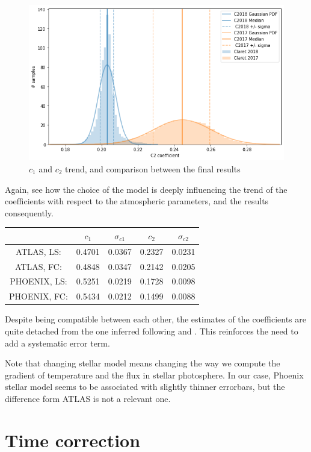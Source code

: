 \documentclass{aa}
\begin{document}
\begin{figure}[H]
    \includegraphics[scale=0.35, angle=0]{pictures/c2_comp.png}
    \caption{$c_1$ and $c_2$ trend, and comparison between the final results}
\end{figure}
Again, see how the choice of the model is deeply influencing the trend of 
the coefficients with respect to the atmospheric parameters, and the results 
consequently. 
\begin{table}[h!]
	\centering
	\begin{tabular}{ccccc}
		\hline
		& $c_1$ & $\sigma_{c1}$ & $c_2$ & $\sigma_{c2}$\\
		\hline
		ATLAS, LS:      & 0.4701 & 0.0367 &0.2327 &0.0231 \\
		ATLAS, FC:      & 0.4848 & 0.0347 & 0.2142 &  0.0205 \\
		PHOENIX, LS:    & 0.5251 & 0.0219 & 0.1728 & 0.0098 \\
		PHOENIX, FC:    & 0.5434 & 0.0212 &  0.1499 & 0.0088 \\
        \hline
	\end{tabular} 
\end{table}
Despite being compatible between each other, the estimates of 
the coefficients are quite detached from the one inferred following 
\cite{claret2017} and \cite{claret2018}. This reinforces the need to add 
a systematic error term. 


Note that changing stellar model means changing the
way we compute the gradient of temperature
and the flux in stellar photosphere. 
In our case, Phoenix stellar model seems to be associated with 
slightly thinner errorbars, but the difference form ATLAS is not 
a relevant one.




\newpage
\section{Time correction}
\label{sect:app_B}
\end{document}
